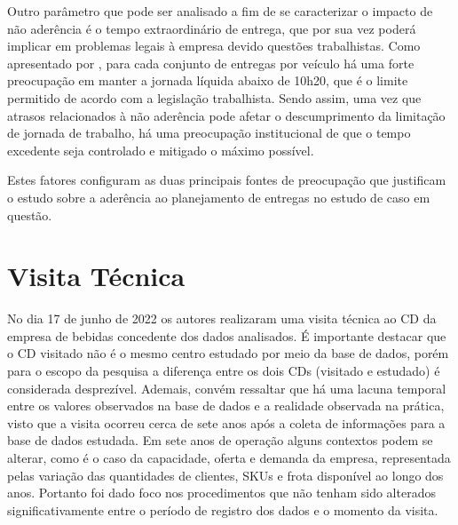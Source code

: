 Outro parâmetro que pode ser analisado a fim de se caracterizar o impacto de não aderência é o tempo extraordinário de entrega, que por sua vez poderá implicar em problemas legais à empresa devido questões trabalhistas. Como apresentado por , para cada conjunto de entregas por veículo há uma forte preocupação em manter a jornada líquida abaixo de 10h20, que é o limite permitido de acordo com a legislação trabalhista. Sendo assim, uma vez que atrasos relacionados à não aderência pode afetar o descumprimento da limitação de jornada de trabalho, há uma preocupação institucional de que o tempo excedente seja controlado e mitigado o máximo possível.

Estes fatores configuram as duas principais fontes de preocupação que justificam o estudo sobre a aderência ao planejamento de entregas no estudo de caso em questão. 

\section{Visita Técnica}  \label{sec:visita_tecnica}

No dia 17 de junho de 2022 os autores realizaram uma visita técnica ao CD da empresa de bebidas concedente dos dados analisados.
%
É importante destacar que o CD visitado não é o mesmo centro estudado por meio da base de dados, porém para o escopo da pesquisa a diferença entre os dois CDs (visitado e estudado) é considerada desprezível.
%
Ademais, convém ressaltar que há uma lacuna temporal entre os valores observados na base de dados e a realidade observada na prática, visto que a visita ocorreu cerca de sete anos após a coleta de informações para a base de dados estudada.
%
Em sete anos de operação alguns contextos podem se alterar, como é o caso da capacidade, oferta e demanda da empresa, representada pelas variação das quantidades de clientes, SKUs e frota disponível ao longo dos anos.
%
Portanto foi dado foco nos procedimentos que não tenham sido alterados significativamente entre o período de registro dos dados e o momento da visita.
%

